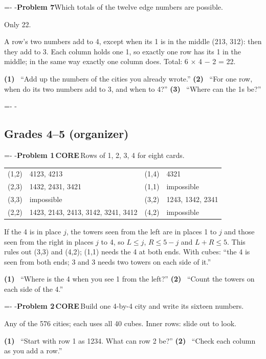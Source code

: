 \documentclass[11pt]{extarticle}
\makeatletter
\newcommand{\needlines}[1]{\par\penalty0\begingroup
  \dimen@=#1\relax\dimen@ii=\pagegoal\advance\dimen@ii-\pagetotal
  \ifdim\dimen@>\dimen@ii\ifdim\dimen@ii>\z@\vfil\fi\penalty-\@M\fi\endgroup}
\newcommand{\core}{\colorbox{accent}{\color{white}\footnotesize\bfseries\,CORE\,}}
\newcommand{\further}{\fcolorbox{accent}{white}{\color{accent}\footnotesize\bfseries\,FURTHER\,}}
\newcommand{\pb}[3]{\par\needlines{4\baselineskip}\addvspace{5pt}\noindent\textbf{Problem #1}\enspace#2\enspace #3\par\nopagebreak[4]}
\newcommand{\hint}[1]{\textbf{(#1)}~}
\newcommand{\tsub}[1]{\needlines{9\baselineskip}\subsection{#1}}
\makeatother
\begin{document}
\pb{7}{\further}{Which totals of the twelve edge numbers are possible.}
\begin{pbody}
\item[Answer] Only 22.
\item[Why] A row's two numbers add to 4, except when its 1 is in the middle (213, 312): then they add to 3. Each column holds one 1, so exactly one row has its 1 in the middle; in the same way exactly one column does. Total: 6 $\times$ 4 $-$ 2 = 22.
\item[Hints] \hint1 ``Add up the numbers of the cities you already wrote.'' \hint2 ``For one row, when do its two numbers add to 3, and when to 4?'' \hint3 ``Where can the 1s be?''
\end{pbody}

\tsub{Grades 4--5 (organizer)}

\pb{1}{\core}{Rows of 1, 2, 3, 4 for eight cards.}
\begin{pbody}
\item[Answer] \begin{tabular}[t]{@{}l l@{\qquad}l l@{}}
(1,2) & 4123, 4213 & (1,4) & 4321 \\
(2,3) & 1432, 2431, 3421 & (1,1) & impossible \\
(3,3) & impossible & (3,2) & 1243, 1342, 2341 \\
(2,2) & 1423, 2143, 2413, 3142, 3241, 3412 & (4,2) & impossible \\
\end{tabular}
\item[Why] If the 4 is in place $j$, the towers seen from the left are in places 1 to $j$ and those seen from the right in places $j$ to 4, so $L\le j$, $R\le 5-j$ and $L+R\le 5$. This rules out (3,3) and (4,2); (1,1) needs the 4 at both ends. With cubes: ``the 4 is seen from both ends; 3 and 3 needs two towers on each side of it.''
\item[Hints] \hint1 ``Where is the 4 when you see 1 from the left?'' \hint2 ``Count the towers on each side of the 4.''
\end{pbody}

\pb{2}{\core}{Build one 4-by-4 city and write its sixteen numbers.}
\begin{pbody}
\item[Answer] Any of the 576 cities; each uses all 40 cubes. Inner rows: slide out to look.
\item[Hints] \hint1 ``Start with row 1 as 1234. What can row 2 be?'' \hint2 ``Check each column as you add a row.''
\end{pbody}
\end{document}
